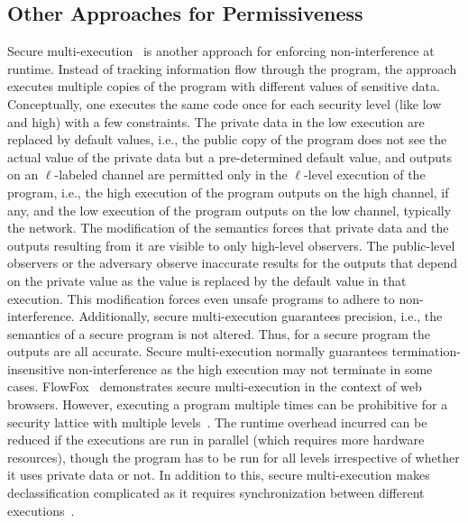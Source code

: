 \subsection{Other Approaches for Permissiveness}
Secure multi-execution~\cite{SME} is another approach for enforcing
non-interference at runtime. Instead of tracking information flow
through the program, the approach executes multiple copies of the
program with different values of sensitive data. Conceptually, one
executes the same code once for each security level (like low and
high) with a few constraints. The private data in the low execution
are replaced by default values, i.e., the public copy of the
program does not see the actual value of the private data but a
pre-determined default value, and outputs on an $\ell$-labeled channel 
are permitted only in the $\ell$-level execution of the program, i.e.,
the high execution of the program outputs on the high channel, if any,
and the low execution of the program outputs on the low channel,
typically the network. 
%
The modification of the semantics forces that private data and the
outputs resulting from it are visible to only high-level
observers. The public-level observers or the adversary observe
inaccurate results for the outputs that depend on the private value as
the value is replaced by the default value in that execution. 
This modification forces even unsafe programs to
adhere to non-interference. Additionally, secure multi-execution
guarantees precision, i.e., the semantics of a secure program is
not altered. Thus, for a secure program the outputs are all
accurate. Secure multi-execution normally guarantees
termination-insensitive non-interference as the high execution may not
terminate in some cases. FlowFox~\cite{flowfox} demonstrates secure
multi-execution in the context of web browsers. 
%
However, executing a program multiple times can be prohibitive for a
security lattice with multiple levels~\cite{austin12POPL}. The runtime
overhead incurred can be reduced if the executions are run in parallel
(which requires more hardware resources), though the program has 
to be run for all levels irrespective of whether it uses private data
or not. In addition to this, secure multi-execution makes
declassification complicated as it requires synchronization between
different executions~\cite{fineSME}. 


